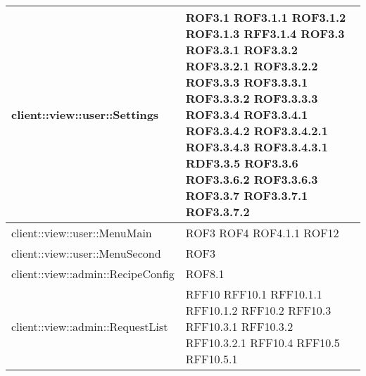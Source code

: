 \begin{center}
\begin{longtable}{| p{11cm} | p{2.5cm} |}
\hline
client::view::user::Settings & ROF3.1 \newline ROF3.1.1 \newline ROF3.1.2 \newline ROF3.1.3 \newline RFF3.1.4 \newline ROF3.3 \newline ROF3.3.1 \newline ROF3.3.2 \newline ROF3.3.2.1 \newline ROF3.3.2.2 \newline ROF3.3.3 \newline ROF3.3.3.1 \newline ROF3.3.3.2 \newline ROF3.3.3.3 \newline ROF3.3.4 \newline ROF3.3.4.1 \newline ROF3.3.4.2 \newline ROF3.3.4.2.1 \newline ROF3.3.4.3 \newline ROF3.3.4.3.1 \newline RDF3.3.5 \newline ROF3.3.6 \newline ROF3.3.6.2 \newline ROF3.3.6.3 \newline ROF3.3.7 \newline ROF3.3.7.1 \newline ROF3.3.7.2 \\
\hline
client::view::user::MenuMain & ROF3 \newline ROF4 \newline ROF4.1.1 \newline ROF12 \\
\hline
client::view::user::MenuSecond & ROF3 \\
\hline
client::view::admin::RecipeConfig & ROF8.1 \\
\hline
client::view::admin::RequestList & RFF10 \newline RFF10.1 \newline RFF10.1.1 \newline RFF10.1.2 \newline RFF10.2 \newline RFF10.3 \newline RFF10.3.1 \newline RFF10.3.2 \newline RFF10.3.2.1 \newline RFF10.4 \newline RFF10.5 \newline RFF10.5.1 \\

\end{longtable}
\end{center}
